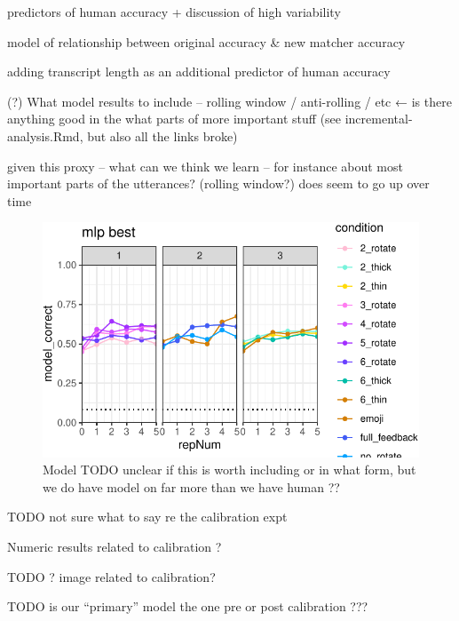 \documentclass[10pt, letterpaper]{article}
\begin{document}
predictors of human accuracy + discussion of high variability

model of relationship between original accuracy \& new matcher accuracy

adding transcript length as an additional predictor of human accuracy

(?) What model results to include -- rolling window / anti-rolling / etc
← is there anything good in the what parts of more important stuff (see
incremental-analysis.Rmd, but also all the links broke)

given this proxy -- what can we think we learn -- for instance about
most important parts of the utterances? (rolling window?) does seem to
go up over time

\begin{CodeChunk}
\begin{figure}[t]

{\centering \includegraphics[width=1\linewidth]{figs/fig-4-1} 

}

\caption[Model TODO unclear if this is worth including or in what form, but we do have model on far more than we have human ??]{Model TODO unclear if this is worth including or in what form, but we do have model on far more than we have human ??}\label{fig:fig-4}
\end{figure}
\end{CodeChunk}

TODO not sure what to say re the calibration expt

Numeric results related to calibration ?

TODO ? image related to calibration?

TODO is our ``primary'' model the one pre or post calibration ???
\end{document}
